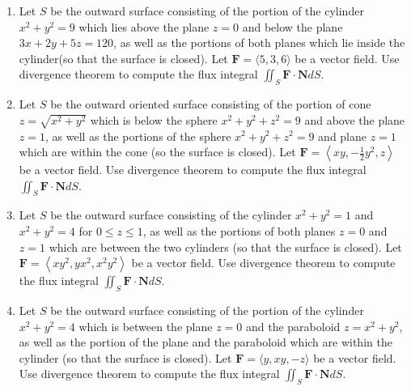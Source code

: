 \documentclass[10pt]{article}
\begin{document}
\begin{enumerate}
	\vspace*{0.4\textheight}
	
	\item Let $S$ be the outward surface consisting of the portion of the cylinder $x^{2}+y^{2}=9$ which lies above the plane $z=0$ and below the plane $3 x+2 y+5 z=120$, as well as the portions of both planes which lie inside the cylinder(so that the surface is closed). Let $\mathbf{F}=\langle 5,3,6\rangle$ be a vector field. Use divergence theorem to compute the flux integral $\iint_{S} \mathbf{F} \cdot \mathbf{N} d S$.
  
	 \vspace*{0.33\textheight}
	
	\item Let $S$ be the outward oriented surface consisting of the portion of cone $z=\sqrt{x^{2}+y^{2}}$ which is below the sphere $x^{2}+y^{2}+z^{2}=9$ and above the plane $z=1$, as well as the portions of the sphere $x^{2}+y^{2}+z^{2}=9$ and plane $z=1$ which are within the cone (so the surface is closed). Let $\mathbf{F}=\left\langle x y,-\frac{1}{2} y^{2}, z\right\rangle$ be a vector field. Use divergence theorem to compute the flux integral $\iint_{S} \mathbf{F} \cdot \mathbf{N} d S$.
  
	 \vspace*{0.4\textheight}
	
	\item Let $S$ be the outward surface consisting of the cylinder $x^{2}+y^{2}=1$ and $x^{2}+y^{2}=4$ for $0 \leq z \leq 1$, as well as the portions of both planes $z=0$ and $z=1$ which are between the two cylinders (so that the surface is closed). Let $\mathbf{F}=\left\langle x y^{2}, y x^{2}, x^{2} y^{2}\right\rangle$ be a vector field. Use divergence theorem to compute the flux integral $\iint_{S} \mathbf{F} \cdot \mathbf{N} d S$.
	
	 \vspace*{0.33\textheight}
  \item Let $S$ be the outward surface consisting of the portion of the cylinder $x^{2}+y^{2}=4$ which is between the plane $z=0$ and the paraboloid $z=x^{2}+y^{2}$, as well as the portion of the plane and the paraboloid which are within the cylinder (so that the surface is closed). Let $\mathbf{F}=\langle y, x y,-z\rangle$ be a vector field. Use divergence theorem to compute the flux integral $\iint_{S} \mathbf{F} \cdot \mathbf{N} d S$.
	
	\vspace*{0.4\textheight}
	

\end{enumerate}
\end{document}
